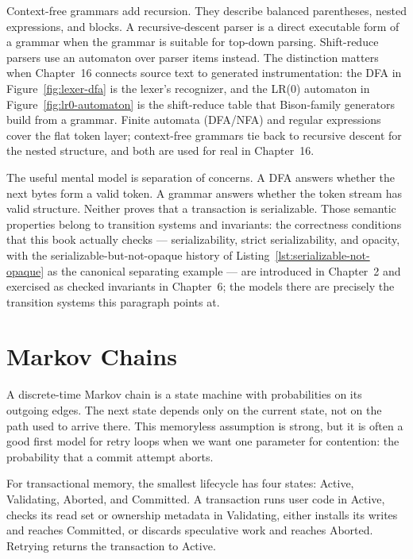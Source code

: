 Context-free grammars add recursion. They describe balanced parentheses, nested expressions, and blocks. A recursive-descent parser is a direct executable form of a grammar when the grammar is suitable for top-down parsing. Shift-reduce parsers use an automaton over parser items instead. The distinction matters when Chapter~16 connects source text to generated instrumentation: the DFA in Figure~\ref{fig:lexer-dfa} is the lexer's recognizer, and the LR(0) automaton in Figure~\ref{fig:lr0-automaton} is the shift-reduce table that Bison-family generators build from a grammar. Finite automata (DFA/NFA) and regular expressions cover the flat token layer; context-free grammars tie back to recursive descent for the nested structure, and both are used for real in Chapter~16.

The useful mental model is separation of concerns. A DFA answers whether the next bytes form a valid token. A grammar answers whether the token stream has valid structure. Neither proves that a transaction is serializable. Those semantic properties belong to transition systems and invariants: the correctness conditions that this book actually checks --- serializability, strict serializability, and opacity, with the serializable-but-not-opaque history of Listing~\ref{lst:serializable-not-opaque} as the canonical separating example --- are introduced in Chapter~2 and exercised as checked invariants in Chapter~6; the models there are precisely the transition systems this paragraph points at.

\section{Markov Chains}

A discrete-time Markov chain is a state machine with probabilities on its outgoing edges. The next state depends only on the current state, not on the path used to arrive there. This memoryless assumption is strong, but it is often a good first model for retry loops when we want one parameter for contention: the probability that a commit attempt aborts.

For transactional memory, the smallest lifecycle has four states: Active, Validating, Aborted, and Committed. A transaction runs user code in Active, checks its read set or ownership metadata in Validating, either installs its writes and reaches Committed, or discards speculative work and reaches Aborted. Retrying returns the transaction to Active.

